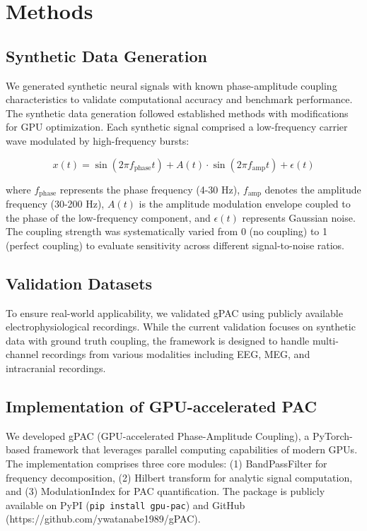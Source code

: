 
\section{Methods}

\subsection{Synthetic Data Generation}
We generated synthetic neural signals with known phase-amplitude coupling characteristics to validate computational accuracy and benchmark performance. The synthetic data generation followed established methods \citep{Tort2010} with modifications for GPU optimization. Each synthetic signal comprised a low-frequency carrier wave modulated by high-frequency bursts:

\begin{equation}
x(t) = \sin(2\pi f_{\text{phase}} t) + A(t) \cdot \sin(2\pi f_{\text{amp}} t) + \epsilon(t)
\end{equation}

where $f_{\text{phase}}$ represents the phase frequency (4-30 Hz), $f_{\text{amp}}$ denotes the amplitude frequency (30-200 Hz), $A(t)$ is the amplitude modulation envelope coupled to the phase of the low-frequency component, and $\epsilon(t)$ represents Gaussian noise. The coupling strength was systematically varied from 0 (no coupling) to 1 (perfect coupling) to evaluate sensitivity across different signal-to-noise ratios.

\subsection{Validation Datasets}
To ensure real-world applicability, we validated gPAC using publicly available electrophysiological recordings. While the current validation focuses on synthetic data with ground truth coupling, the framework is designed to handle multi-channel recordings from various modalities including EEG, MEG, and intracranial recordings.

\subsection{Implementation of GPU-accelerated PAC}
We developed gPAC (GPU-accelerated Phase-Amplitude Coupling), a PyTorch-based framework that leverages parallel computing capabilities of modern GPUs. The implementation comprises three core modules: (1) BandPassFilter for frequency decomposition, (2) Hilbert transform for analytic signal computation, and (3) ModulationIndex for PAC quantification. The package is publicly available on PyPI (\texttt{pip install gpu-pac}) and GitHub (https://github.com/ywatanabe1989/gPAC).

